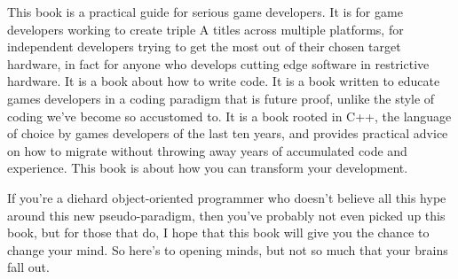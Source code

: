 This book is a practical guide for serious game developers. It is for game
developers working to create triple A titles across multiple platforms, for
independent developers trying to get the most out of their chosen target
hardware, in fact for anyone who develops cutting edge software in restrictive
hardware. It is a book about how to write code. It is a book written to educate
games developers in a coding paradigm that is future proof, unlike the style of
coding we've become so accustomed to. It is a book rooted in C++, the language
of choice by games developers of the last ten years, and provides practical
advice on how to migrate without throwing away years of accumulated code and
experience. This book is about how you can transform your development.

If you're a diehard object-oriented programmer who doesn't believe all this
hype around this new pseudo-paradigm, then you've probably not even picked up
this book, but for those that do, I hope that this book will give you the
chance to change your mind. So here's to opening minds, but not so much that
your brains fall out.
